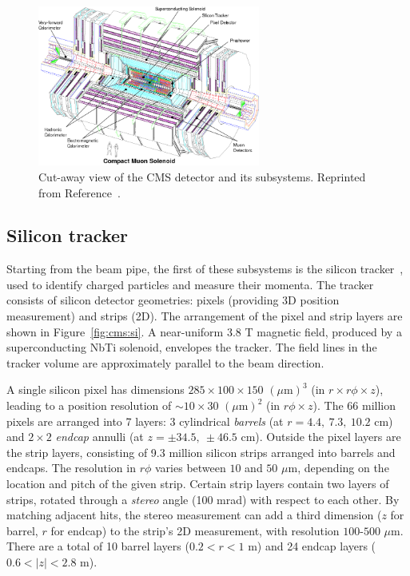 \begin{figure}[][]
    \begin{center}
        \includegraphics[width=0.65\textwidth]{figures/cms/cms.png}
        \caption{Cut-away view of the CMS detector and its subsystems.
                 Reprinted from Reference~\cite{cmsjinst}.}
        \label{fig:cms:cms}
    \end{center}
\end{figure}

\subsection{Silicon tracker}
\label{sec:cms:tracker}

Starting from the beam pipe, the first of these subsystems is the silicon tracker~\cite{cmstracker}, used to identify charged particles and measure their momenta. 
The tracker consists of silicon detector geometries: pixels (providing 3D position measurement) and strips (2D). 
The arrangement of the pixel and strip layers are shown in Figure~\ref{fig:cms:si}.
A near-uniform 3.8 T magnetic field, produced by a superconducting NbTi solenoid, envelopes the tracker. 
The field lines in the tracker volume are approximately parallel to the beam direction. 

A single silicon pixel has dimensions $285\times100\times150$ $(\mu\mathrm{m})^3$ (in $r\times r\phi\times z$), leading to a position resolution of $\sim10\times30$ $(\mu\mathrm{m})^2$ (in $r\phi\times z$). 
The 66 million pixels are arranged into 7 layers: 3 cylindrical \emph{barrels} (at $r=4.4,~7.3,~10.2$ cm) and $2\times2$ \emph{endcap} annulli (at $z=\pm34.5,~\pm46.5$ cm). 
Outside the pixel layers are the strip layers, consisting of 9.3 million silicon strips arranged into barrels and endcaps.
The resolution in $r\phi$ varies between $10$ and $50$ $\mu$m, depending on the location and pitch of the given strip.
Certain strip layers contain two layers of strips, rotated through a \emph{stereo} angle (100 mrad) with respect to each other.
By matching adjacent hits, the stereo measurement can add a third dimension ($z$ for barrel, $r$ for endcap) to the strip's 2D measurement, with resolution $100$-$500$ $\mu$m.
There are a total of 10 barrel layers ($0.2 < r < 1$ m) and 24 endcap layers ($0.6 < |z| < 2.8$ m). 

